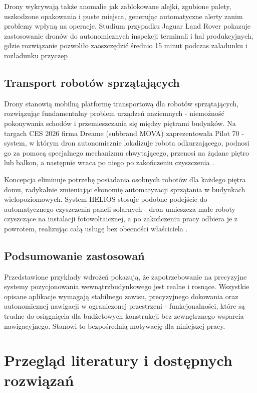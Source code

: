 \documentclass{EE-dyplom}
\begin{document}
Drony wykrywają także anomalie jak zablokowane alejki, zgubione palety, uszkodzone opakowania i puste miejsca, generując automatyczne alerty zanim problemy wpłyną na operacje. Studium przypadku Jaguar Land Rover pokazuje zastosowanie dronów do autonomicznych inspekcji terminali i hal produkcyjnych, gdzie rozwiązanie pozwoliło zaoszczędzić średnio 15 minut podczas załadunku i rozładunku przyczep \cite{autologistics2025}.

\subsection{Transport robotów sprzątających}

Drony stanowią mobilną platformę transportową dla robotów sprzątających, rozwiązując fundamentalny problem urządzeń naziemnych - niemożność pokonywania schodów i przemieszczania się między piętrami budynków. Na targach CES 2026 firma Dreame (subbrand MOVA) zaprezentowała Pilot 70 - system, w którym dron autonomicznie lokalizuje robota odkurzającego, podnosi go za pomocą specjalnego mechanizmu chwytającego, przenosi na żądane piętro lub balkon, a następnie wraca po niego po zakończeniu czyszczenia \cite{cnet2026}.

Koncepcja eliminuje potrzebę posiadania osobnych robotów dla każdego piętra domu, radykalnie zmieniając ekonomię automatyzacji sprzątania w budynkach wielopoziomowych. System HELIOS stosuje podobne podejście do automatycznego czyszczenia paneli solarnych - dron umieszcza małe roboty czyszczące na instalacji fotowoltaicznej, a po zakończeniu pracy odbiera je z powrotem, realizując całą usługę bez obecności właściciela \cite{artrobotics2025}.

\subsection{Podsumowanie zastosowań}

Przedstawione przykłady wdrożeń pokazują, że zapotrzebowanie na precyzyjne systemy pozycjonowania wewnątrzbudynkowego jest realne i rosnące. Wszystkie opisane aplikacje wymagają stabilnego zawisu, precyzyjnego dokowania oraz autonomicznej nawigacji w ograniczonej przestrzeni - funkcjonalności, które są trudne do osiągnięcia dla budżetowych konstrukcji bez zewnętrznego wsparcia nawigacyjnego. Stanowi to bezpośrednią motywację dla niniejszej pracy.

\section{Przegląd literatury i dostępnych rozwiązań}
\end{document}
